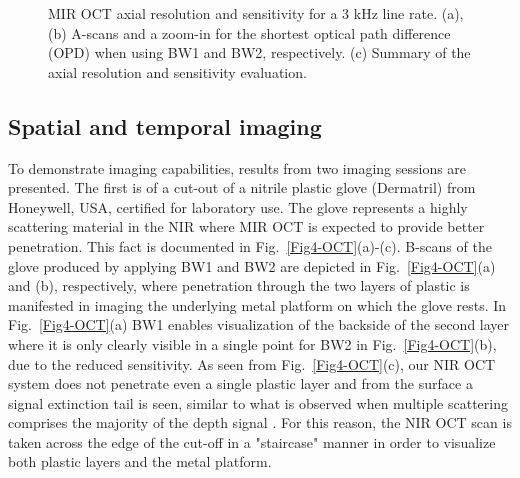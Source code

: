 \documentclass[9pt,twocolumn]{extarticle}
\begin{document}




\begin{figure}[h!]
\centering
{}
\caption{MIR OCT axial resolution and sensitivity for a 3 kHz line rate. (a), (b) A-scans and a zoom-in for the shortest optical path difference (OPD) when using BW1 and BW2, respectively. (c) Summary of the axial resolution and sensitivity evaluation.}
\label{Fig3-OCT}
\end{figure}



\subsection{Spatial and temporal imaging}
To demonstrate imaging capabilities, results from two imaging sessions are presented. The first is of a cut-out of a nitrile plastic glove (Dermatril) from Honeywell, USA, certified for laboratory use. The glove represents a highly scattering material in the NIR where MIR OCT is expected to provide better penetration. This fact is documented in Fig.~\ref{Fig4-OCT}(a)-(c). B-scans of the glove produced by applying BW1 and BW2 are depicted in Fig.~\ref{Fig4-OCT}(a) and (b), respectively, where penetration through the two layers of plastic is manifested in imaging the underlying metal platform on which the glove rests. In Fig.~\ref{Fig4-OCT}(a) BW1 enables visualization of the backside of the second layer where it is only clearly visible in a single point for BW2 in Fig.~\ref{Fig4-OCT}(b), due to the reduced sensitivity. As seen from Fig.~\ref{Fig4-OCT}(c), our NIR OCT system does not penetrate even a single plastic layer and from the surface a signal extinction tail is seen, similar to what is observed when multiple scattering comprises the majority of the depth signal \cite{israelsen2019real}. For this reason, the NIR OCT scan is taken across the edge of the cut-off in a "staircase" manner in order to visualize both plastic layers and the metal platform. 
\end{document}
